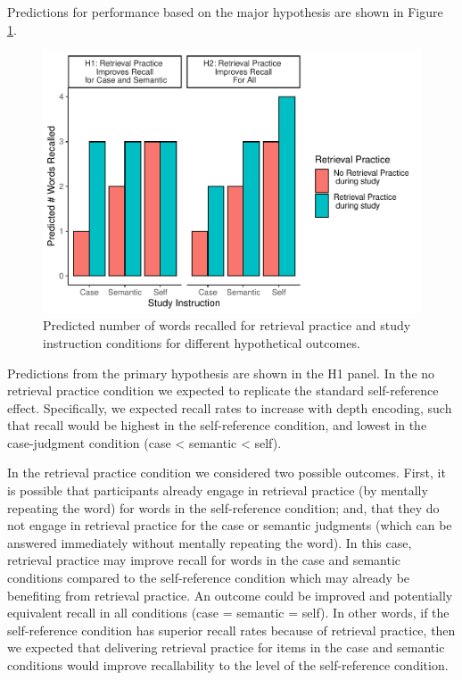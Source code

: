 \documentclass[
  man,floatsintext]{apa6}
\begin{document}
Predictions for performance based on the major hypothesis are shown in Figure \ref{fig:predictions}.

\begin{figure}
\centering
\includegraphics{Thesis_files/figure-latex/predictions-1.pdf}
\caption{\label{fig:predictions}Predicted number of words recalled for retrieval practice and study instruction conditions for different hypothetical outcomes.}
\end{figure}

Predictions from the primary hypothesis are shown in the H1 panel. In the no retrieval practice condition we expected to replicate the standard self-reference effect. Specifically, we expected recall rates to increase with depth encoding, such that recall would be highest in the self-reference condition, and lowest in the case-judgment condition (case \textless{} semantic \textless{} self).

In the retrieval practice condition we considered two possible outcomes. First, it is possible that participants already engage in retrieval practice (by mentally repeating the word) for words in the self-reference condition; and, that they do not engage in retrieval practice for the case or semantic judgments (which can be answered immediately without mentally repeating the word). In this case, retrieval practice may improve recall for words in the case and semantic conditions compared to the self-reference condition which may already be benefiting from retrieval practice. An outcome could be improved and potentially equivalent recall in all conditions (case = semantic = self). In other words, if the self-reference condition has superior recall rates because of retrieval practice, then we expected that delivering retrieval practice for items in the case and semantic conditions would improve recallability to the level of the self-reference condition.
\end{document}
